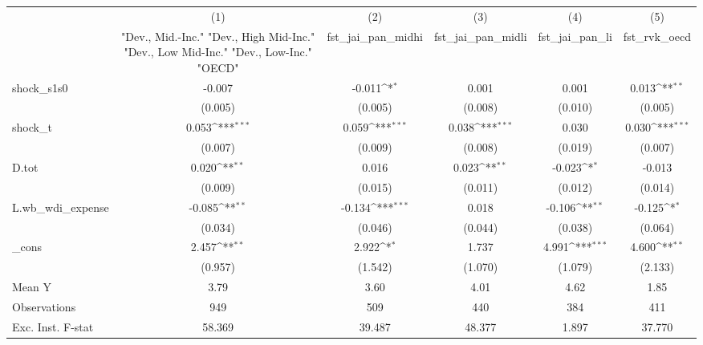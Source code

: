 {
\def\sym#1{\ifmmode^{#1}\else\(^{#1}\)\fi}
\begin{tabular}{l*{5}{c}}
\toprule
            &\multicolumn{1}{c}{(1)}&\multicolumn{1}{c}{(2)}&\multicolumn{1}{c}{(3)}&\multicolumn{1}{c}{(4)}&\multicolumn{1}{c}{(5)}\\
            &\multicolumn{1}{c}{ "Dev., Mid.-Inc." "Dev., High Mid-Inc." "Dev., Low Mid-Inc." "Dev., Low-Inc." "OECD" }&\multicolumn{1}{c}{fst\_jai\_pan\_midhi}&\multicolumn{1}{c}{fst\_jai\_pan\_midli}&\multicolumn{1}{c}{fst\_jai\_pan\_li}&\multicolumn{1}{c}{fst\_rvk\_oecd}\\
\midrule
shock\_s1s0  &      -0.007         &      -0.011\sym{*}  &       0.001         &       0.001         &       0.013\sym{**} \\
            &     (0.005)         &     (0.005)         &     (0.008)         &     (0.010)         &     (0.005)         \\
\addlinespace
shock\_t     &       0.053\sym{***}&       0.059\sym{***}&       0.038\sym{***}&       0.030         &       0.030\sym{***}\\
            &     (0.007)         &     (0.009)         &     (0.008)         &     (0.019)         &     (0.007)         \\
\addlinespace
D.tot       &       0.020\sym{**} &       0.016         &       0.023\sym{**} &      -0.023\sym{*}  &      -0.013         \\
            &     (0.009)         &     (0.015)         &     (0.011)         &     (0.012)         &     (0.014)         \\
\addlinespace
L.wb\_wdi\_expense&      -0.085\sym{**} &      -0.134\sym{***}&       0.018         &      -0.106\sym{**} &      -0.125\sym{*}  \\
            &     (0.034)         &     (0.046)         &     (0.044)         &     (0.038)         &     (0.064)         \\
\addlinespace
\_cons      &       2.457\sym{**} &       2.922\sym{*}  &       1.737         &       4.991\sym{***}&       4.600\sym{**} \\
            &     (0.957)         &     (1.542)         &     (1.070)         &     (1.079)         &     (2.133)         \\
\midrule
Mean Y      &        3.79         &        3.60         &        4.01         &        4.62         &        1.85         \\
Observations&         949         &         509         &         440         &         384         &         411         \\
Exc. Inst. F-stat&      58.369         &      39.487         &      48.377         &       1.897         &      37.770         \\
\bottomrule
\end{tabular}
}

